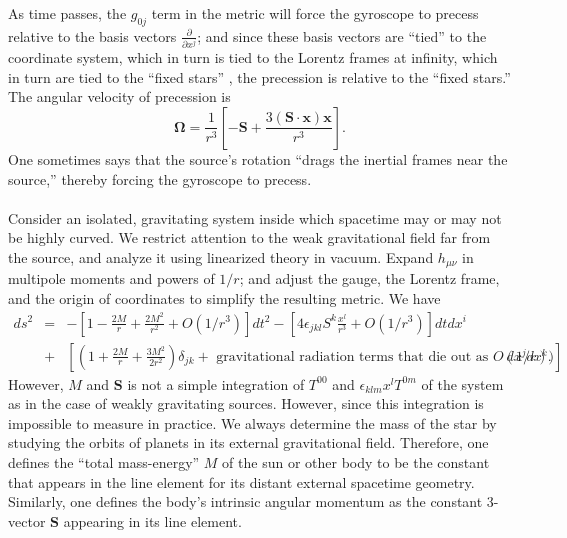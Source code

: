 As time passes, the $g_{0j}$ term in the metric will force the gyroscope to precess relative to the basis vectors $\frac{\partial}{\partial x^j}$; and since these basis vectors are ``tied'' to the coordinate system, which
in turn is tied to the Lorentz frames at infinity, which in turn are tied to the ``fixed stars'' , the precession is relative to the ``fixed stars.'' 
The angular velocity of precession is
\[\bm{\Omega} = \frac{1}{r^3} \left[ -\bm{S} + \frac{3(\bm{S}\cdot \bm{x})\bm{x}}{r^3} \right] .\]
One sometimes says that the source's rotation ``drags the inertial frames near the source,'' thereby forcing the gyroscope to precess.
\\ \\
Consider an isolated, gravitating system inside which spacetime may or may not be highly curved. We restrict attention to the weak gravitational field far from the source, and analyze it using linearized theory in vacuum.
Expand $h_{\mu\nu}$ in multipole moments and powers of $1/r$; and adjust the gauge, the Lorentz frame, and the origin of coordinates to simplify the resulting metric.
We have
\begin{eqnarray}
ds^2 &=& -\left[1-\frac{2M}{r} + \frac{2M^2}{r^2} + O({1}/{r^3}) \right]dt^2 - \left[4\epsilon_{jkl}S^k \frac{x^l}{r^3} + O({1}/{r^3})  \right] dtdx^i  \nonumber \\
&+& \left[(1+\frac{2M}{r} + \frac{3M^2}{2r^2})\delta_{jk} + \mbox{ gravitational radiation terms that die out as } O({1}/{r}) ) \right]dx^j dx^k. \nonumber
\end{eqnarray}
However, $M$ and $\bm{S}$ is not a simple integration of $T^{00}$ and $\epsilon_{klm} x^l T^{0m}$ of the system as in the case of weakly gravitating sources.
However, since this integration is impossible to measure in practice. We always determine the mass of the star by studying the orbits of planets in its external gravitational field. Therefore, one defines the ``total mass-energy'' $M$ of the sun or other body to be the constant that appears in the line element for its distant external spacetime geometry. Similarly, one defines the body's intrinsic angular momentum as the constant 3-vector $\bm{S}$ appearing in its line element.

